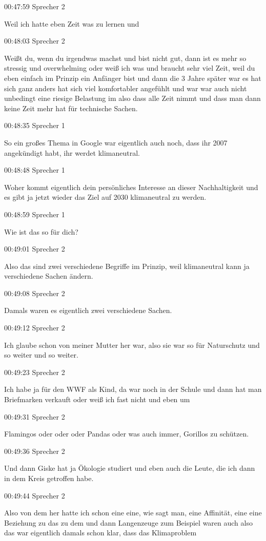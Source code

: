 00:47:59 Sprecher 2

Weil ich hatte eben Zeit was zu lernen und

00:48:03 Sprecher 2

Weißt du, wenn du irgendwas machst und bist nicht gut, dann ist es mehr
so stressig und overwhelming oder weiß ich was und braucht sehr viel
Zeit, weil du eben einfach im Prinzip ein Anfänger bist und dann die 3
Jahre später war es hat sich ganz anders hat sich viel komfortabler
angefühlt und war war auch nicht unbedingt eine riesige Belastung im
also dass alle Zeit nimmt und dass man dann keine Zeit mehr hat für
technische Sachen.

00:48:35 Sprecher 1

So ein großes Thema in Google war eigentlich auch noch, dass ihr 2007
angekündigt habt, ihr werdet klimaneutral.

00:48:48 Sprecher 1

Woher kommt eigentlich dein persönliches Interesse an dieser
Nachhaltigkeit und es gibt ja jetzt wieder das Ziel auf 2030
klimaneutral zu werden.

00:48:59 Sprecher 1

Wie ist das so für dich?

00:49:01 Sprecher 2

Also das sind zwei verschiedene Begriffe im Prinzip, weil klimaneutral
kann ja verschiedene Sachen ändern.

00:49:08 Sprecher 2

Damals waren es eigentlich zwei verschiedene Sachen.

00:49:12 Sprecher 2

Ich glaube schon von meiner Mutter her war, also sie war so für
Naturschutz und so weiter und so weiter.

00:49:23 Sprecher 2

Ich habe ja für den WWF als Kind, da war noch in der Schule und dann hat
man Briefmarken verkauft oder weiß ich fast nicht und eben um

00:49:31 Sprecher 2

Flamingos oder oder oder Pandas oder was auch immer, Gorillos zu
schützen.

00:49:36 Sprecher 2

Und dann Giske hat ja Ökologie studiert und eben auch die Leute, die ich
dann in dem Kreis getroffen habe.

00:49:44 Sprecher 2

Also von dem her hatte ich schon eine eine, wie sagt man, eine
Affinität, eine eine Beziehung zu das zu dem und dann Langenzeuge zum
Beispiel waren auch also das war eigentlich damals schon klar, dass das
Klimaproblem

